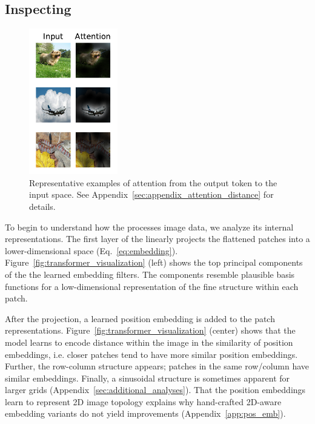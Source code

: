 \subsection{Inspecting \oursfull{}}
\begin{figure}
\centering
\vspace{-2.7mm}
\includegraphics[height=2.5in,trim={0in 0in 0.15in 0in},clip]{images/visualizations/20201002_selected_attention_examples.pdf}
\caption{Representative examples of attention from the output token to the input space. See Appendix~\ref{sec:appendix_attention_distance} for details.}
\label{fig:selected_attention_examples}
\vspace{-4mm}
\end{figure}
To begin to understand how the \oursfull{} processes image data, we analyze its internal representations.
The first layer of the \oursfull{} linearly projects the flattened patches into a lower-dimensional space (Eq.~\ref{eq:embedding}). 
Figure~\ref{fig:transformer_visualization} (left) shows the top principal components of the the learned embedding filters. 
The components resemble plausible basis functions for a low-dimensional representation of the fine structure within each patch.

After the projection, a learned position embedding is added to the  patch representations. 
Figure~\ref{fig:transformer_visualization} (center) shows that the model learns to encode distance within the image in the similarity of position embeddings, i.e. closer patches tend to have more similar position embeddings. 
Further, the row-column structure appears; patches in the same row/column have similar embeddings.
Finally, a sinusoidal structure is sometimes apparent for larger grids (Appendix~\ref{sec:additional_analyses}). 
That the position embeddings learn to represent 2D image topology explains why hand-crafted 2D-aware embedding variants do not yield improvements (Appendix~\ref{app:pos_emb}).

